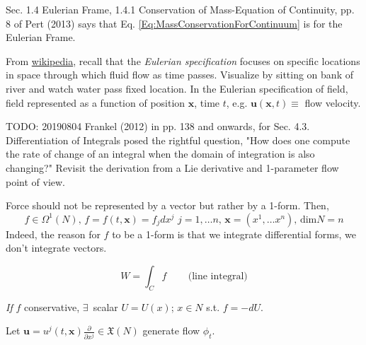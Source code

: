 \documentclass[10pt]{amsart}
\begin{document}
\begin{multicols*}{2}
Sec. 1.4 Eulerian Frame, 1.4.1 Conservation of Mass-Equation of Continuity, pp. 8 of Pert (2013) \cite{Pert2013} says that Eq. \ref{Eq:MassConservationForContinuum} is for the Eulerian Frame.

From \href{https://en.wikipedia.org/wiki/Lagrangian_and_Eulerian_specification_of_the_flow_field}{wikipedia}, recall that the \emph{Eulerian specification} focuses on specific locations in space through which fluid flow as time passes. Visualize by sitting on bank of river and watch water pass fixed location. In the Eulerian specification of field, field represented as a function of position $\mathbf{x}$, time $t$, e.g. $\mathbf{u}(\mathbf{x}, t) \equiv $ flow velocity.




TODO: 20190804 Frankel (2012) \cite{TFrankel2012} in pp. 138 and onwards, for Sec. 4.3. Differentiation of Integrals posed the rightful question, "How does one compute the rate of change of an integral when the domain of integration is also changing?" Revisit the derivation from a Lie derivative and 1-parameter flow point of view.

Force should not be represented by a vector but rather by a 1-form. Then, 
\[
f \in \Omega^1(N), \, f=f(t, \mathbf{x}) = f_j dx^j \, \, j=1, \dots n , \, \mathbf{x} = (x^1, \dots x^n), \, \text{dim}N = n
\]
Indeed, the reason for $f$ to be a 1-form is that we integrate differential forms, we don't integrate vectors. 

\begin{equation}
W = \int_C f \qquad \, \text{(line integral)}
\end{equation}

\emph{If} $f$ conservative, $\exists\, $ scalar $U = U(x)$; $x\in N$ s.t. $f=-dU$.

Let $\mathbf{u} = u^j(t,\mathbf{x}) \frac{\partial}{ \partial x^j} \in \mathfrak{X}(N)$ generate flow $\phi_t$.


\end{multicols*}
\end{document}
